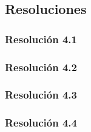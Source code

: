 \subsection{Resoluciones}

\subsubsection{Resolución 4.1}


\subsubsection{Resolución 4.2}


\subsubsection{Resolución 4.3}


\subsubsection{Resolución 4.4}

